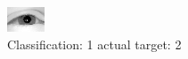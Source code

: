 \begin{figure}[h!]
\begin{center}
\includegraphics[width=0.60\columnwidth]{figures/ID2263_class_1_target_2.png}
\end{center}
\caption{ Classification: 1 actual target: 2}
\label{fig:ID2263_class_1_target_2}
\end{figure}
